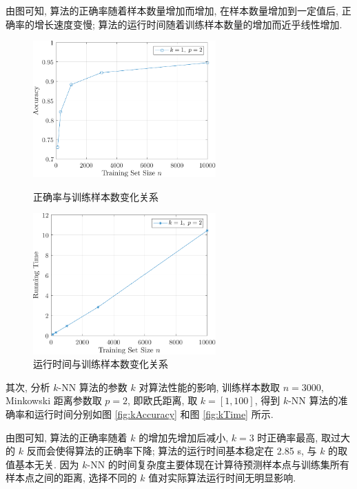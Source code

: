 \documentclass[openany]{ctexbook}
\theoremstyle{kaiti}
\theoremstyle{normal}
\begin{document}
由图可知, 算法的正确率随着样本数量增加而增加, 在样本数量增加到一定值后, 正确率的增长速度变慢; 算法的运行时间随着训练样本数量的增加而近乎线性增加.

\begin{figure}[htbp]
  \centering
  \begin{minipage}[t]{0.48\textwidth}
    \centering
    \includegraphics[width=7cm]{sampleAccuracy.pdf}
    \caption{正确率与训练样本数变化关系}
    \label{fig:sampleAccuracy}
  \end{minipage}
  \begin{minipage}[t]{0.48\textwidth}
    \centering
    \includegraphics[width=7cm]{sampleTime.pdf}
    \caption{运行时间与训练样本数变化关系}
    \label{fig:sampleTime}
  \end{minipage}
\end{figure}

其次, 分析 $k$-NN 算法的参数 $k$ 对算法性能的影响, 训练样本数取 $n=3000$, Minkowski 距离参数取 $p=2$, 即欧氏距离, 取 $k=[1,100]$, 得到 $k$-NN 算法的准确率和运行时间分别如图 \ref{fig:kAccuracy} 和图 \ref{fig:kTime} 所示.

由图可知, 算法的正确率随着 $k$ 的增加先增加后减小, $k=3$ 时正确率最高, 取过大的 $k$ 反而会使得算法的正确率下降; 算法的运行时间基本稳定在 2.85 s, 与 $k$ 的取值基本无关. 因为 $k$-NN 的时间复杂度主要体现在计算待预测样本点与训练集所有样本点之间的距离, 选择不同的 $k$ 值对实际算法运行时间无明显影响.
\end{document}
